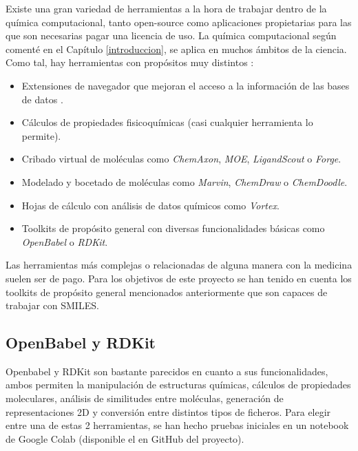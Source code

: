 Existe una gran variedad de herramientas a la hora de trabajar dentro de la química computacional, tanto open-source como aplicaciones propietarias para las que son necesarias pagar una licencia de uso. La química computacional según comenté en el Capítulo \ref{introduccion}, se aplica en muchos ámbitos de la ciencia. Como tal, hay herramientas con propósitos muy distintos \cite{toolkits_recap}: 
\begin{itemize}
    \item Extensiones de navegador que mejoran el acceso a la información de las bases de datos \cite{safari_extensions}.
    \item Cálculos de propiedades fisicoquímicas (casi cualquier herramienta lo permite).
    \item Cribado virtual de moléculas como \textit{ChemAxon}, \textit{MOE}, \textit{LigandScout} o \textit{Forge}.
    \item Modelado y bocetado de moléculas como \textit{Marvin}, \textit{ChemDraw} o \textit{ChemDoodle}.
    \item Hojas de cálculo con análisis de datos químicos como \textit{Vortex}.
    \item Toolkits de propósito general con diversas funcionalidades básicas como \textit{OpenBabel} o \textit{RDKit}.
\end{itemize}
Las herramientas más complejas o relacionadas de alguna manera con la medicina suelen ser de pago. Para los objetivos de este proyecto se han tenido en cuenta los toolkits de propósito general mencionados anteriormente que son capaces de trabajar con SMILES.

\subsection{OpenBabel y RDKit}

Openbabel y RDKit son bastante parecidos en cuanto a sus funcionalidades, ambos permiten la manipulación de estructuras químicas, cálculos de propiedades moleculares, análisis de similitudes entre moléculas, generación de representaciones 2D y conversión entre distintos tipos de ficheros. Para elegir entre una de estas 2 herramientas, se han hecho pruebas iniciales en un notebook de Google Colab \cite{google_colab} (disponible el en GitHub del proyecto).


